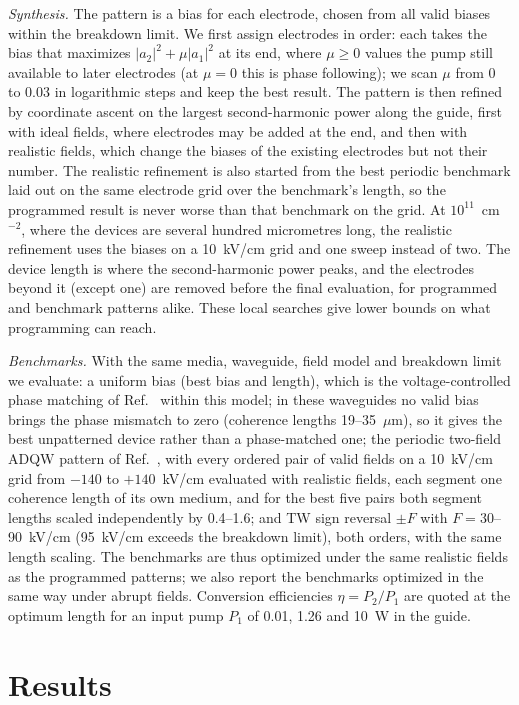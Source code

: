 \documentclass[11pt]{article}
\newcommand{\um}{~$\mu$m}
\begin{document}
\emph{Synthesis.} The pattern is a bias for each electrode, chosen from all valid biases within the breakdown limit. We first assign electrodes in order: each takes the bias that maximizes $|a_2|^2+\mu|a_1|^2$ at its end, where $\mu\ge0$ values the pump still available to later electrodes (at $\mu=0$ this is phase following); we scan $\mu$ from 0 to 0.03 in logarithmic steps and keep the best result. The pattern is then refined by coordinate ascent on the largest second-harmonic power along the guide, first with ideal fields, where electrodes may be added at the end, and then with realistic fields, which change the biases of the existing electrodes but not their number. The realistic refinement is also started from the best periodic benchmark laid out on the same electrode grid over the benchmark's length, so the programmed result is never worse than that benchmark on the grid. At $10^{11}$~cm$^{-2}$, where the devices are several hundred micrometres long, the realistic refinement uses the biases on a 10~kV/cm grid and one sweep instead of two. The device length is where the second-harmonic power peaks, and the electrodes beyond it (except one) are removed before the final evaluation, for programmed and benchmark patterns alike. These local searches give lower bounds on what programming can reach.

\emph{Benchmarks.} With the same media, waveguide, field model and breakdown limit we evaluate: a uniform bias (best bias and length), which is the voltage-controlled phase matching of Ref.~\cite{Meyer1995APL} within this model; in these waveguides no valid bias brings the phase mismatch to zero (coherence lengths 19--35\um), so it gives the best unpatterned device rather than a phase-matched one; the periodic two-field ADQW pattern of Ref.~\cite{OwnbyN1}, with every ordered pair of valid fields on a 10~kV/cm grid from $-140$ to $+140$~kV/cm evaluated with realistic fields, each segment one coherence length of its own medium, and for the best five pairs both segment lengths scaled independently by 0.4--1.6; and TW sign reversal $\pm F$ with $F=30$--90~kV/cm (95~kV/cm exceeds the breakdown limit), both orders, with the same length scaling. The benchmarks are thus optimized under the same realistic fields as the programmed patterns; we also report the benchmarks optimized in the same way under abrupt fields. Conversion efficiencies $\eta=P_2/P_1$ are quoted at the optimum length for an input pump $P_1$ of 0.01, 1.26 and 10~W in the guide.

\section{Results}\label{sec:results}
\end{document}
